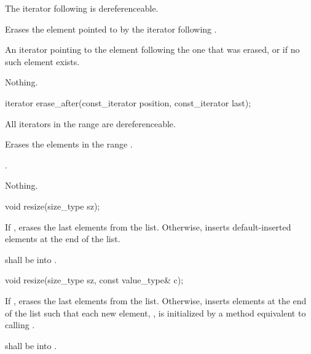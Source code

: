 \begin{itemdescr}
\pnum
\requires The iterator following  is dereferenceable.

\pnum
\effects Erases the element pointed to by the iterator following .

\pnum
\returns An iterator pointing to the element following the one that was
erased, or  if no such element exists.

\pnum
\throws Nothing.
\end{itemdescr}

%
%
\begin{itemdecl}
iterator erase_after(const_iterator position, const_iterator last);
\end{itemdecl}

\begin{itemdescr}
\pnum
\requires All iterators in the range  are dereferenceable.

\pnum
\effects Erases the elements in the range .

\pnum
\returns {}.

\pnum
\throws Nothing.
\end{itemdescr}

%
%
\begin{itemdecl}
void resize(size_type sz);
\end{itemdecl}

\begin{itemdescr}
\pnum
\effects If , erases the last  elements from the list. Otherwise, inserts  default-inserted
elements at the end of the list.

\pnum
\requires {} shall be  into .
\end{itemdescr}

\begin{itemdecl}
void resize(size_type sz, const value_type& c);
\end{itemdecl}

\begin{itemdescr}
\pnum
\effects If , erases the last  elements from the list. Otherwise, inserts   
elements at the end of the list such that each new element, , is initialized
by a method equivalent to calling
.

\pnum
\requires {} shall be  into .
\end{itemdescr}


